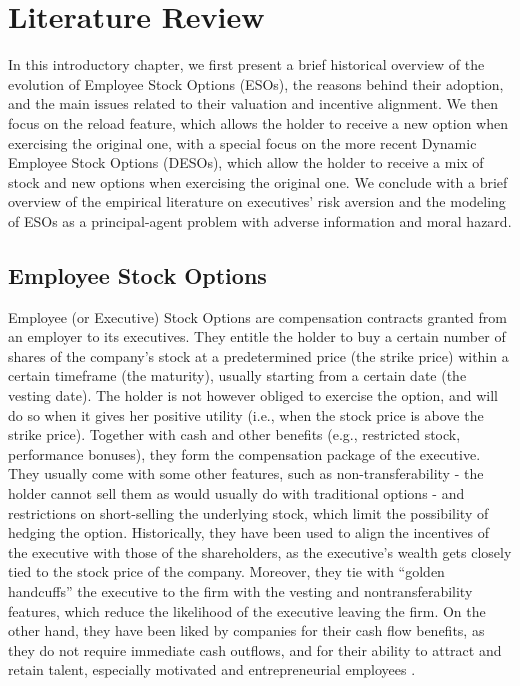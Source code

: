 \section{Literature Review}

In this introductory chapter, we first present a brief historical overview of the evolution of Employee Stock Options (ESOs), the reasons behind their adoption, and the main issues related to their valuation and incentive alignment. We then focus on the reload feature, which allows the holder to receive a new option when exercising the original one, with a special focus on the more recent Dynamic Employee Stock Options (DESOs), which allow the holder to receive a mix of stock and new options when exercising the original one. We conclude with a brief overview of the empirical literature on executives' risk aversion and the modeling of ESOs as a principal-agent problem with adverse information and moral hazard.


\subsection{Employee Stock Options} %
Employee (or Executive) Stock Options are compensation contracts granted from an employer to its executives. They entitle the holder to buy a certain number of shares of the company's stock at a predetermined price (the strike price) within a certain timeframe (the maturity), usually starting from a certain date (the vesting date). The holder is not however obliged to exercise the option, and will do so when it gives her positive utility (i.e., when the stock price is above the strike price).
Together with cash and other benefits (e.g., restricted stock, performance bonuses), they form the compensation package of the executive. They usually come with some other features, such as non-transferability - the holder cannot sell them as would usually do with traditional options - and restrictions on short-selling the underlying stock, which limit the possibility of hedging the option.
Historically, they have been used to align the incentives of the executive with those of the shareholders, as the executive's wealth gets closely tied to the stock price of the company. Moreover, they tie with ``golden handcuffs'' the executive to the firm with the vesting and nontransferability features, which reduce the likelihood of the executive leaving the firm. On the other hand, they have been liked by companies for their cash flow benefits, as they do not require immediate cash outflows, and for their ability to attract and retain talent, especially motivated and entrepreneurial employees \cite{hall2003trouble}.

